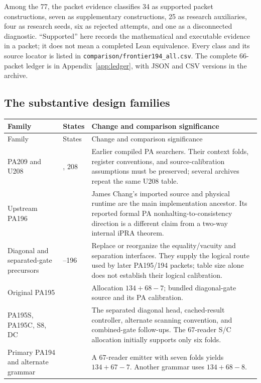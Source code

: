 \documentclass[11pt,letterpaper]{article}
\newcommand{\file}[1]{\texttt{\nolinkurl{#1}}}
\begin{document}
Among the 77, the packet evidence classifies 34 as supported packet
constructions, seven as supplementary constructions, 25 as research
auxiliaries, four as research seeds, six as rejected attempts, and one as
a disconnected diagnostic. ``Supported'' here records the mathematical
and executable evidence in a packet; it does not mean a completed Lean
equivalence. Every class and its source locator is listed in
\file{comparison/frontier194_all.csv}. The complete 66-packet ledger is
in Appendix~\ref{app:ledger}, with JSON and CSV versions in the archive.

\subsection{The substantive design families}

\begin{longtable}{@{}>{\raggedright\arraybackslash}p{}>{\raggedright\arraybackslash}p{}>{\raggedright\arraybackslash}p{}@{}}
\toprule Family & States & Change and comparison significance\\\midrule\endfirsthead
\toprule Family & States & Change and comparison significance\\\midrule\endhead
PA209 and U208 & 209, 208 & Earlier compiled PA searchers. Their context folds,
 register conventions, and source-calibration assumptions must be preserved;
 several archives repeat the same U208 table.\\
Upstream PA196 & 196 & James Chang's imported source and physical runtime are
 the main implementation ancestor. Its reported formal PA nonhalting-to-consistency
 direction is a different claim from a two-way internal iPRA theorem.\\
Diagonal and separated-gate precursors & 199--196 & Replace or reorganize the
 equality/vacuity and separation interfaces. They supply the logical route
 used by later PA195/194 packets; table size alone does not establish their
 logical calibration.\\
Original PA195 & 195 & Allocation $134+68-7$; bundled diagonal-gate source and
 its PA calibration.\\
PA195S, PA195C, S8, DC & 195 & The separated diagonal head, cached-result
 controller, alternate scanning convention, and combined-gate follow-ups.
 The 67-reader S/C allocation initially supports only six folds.\\
Primary PA194 and alternate grammar & 194 & A 67-reader emitter with seven
 folds yields $134+67-7$. Another grammar uses $134+68-8$.

\end{longtable}
\end{document}

